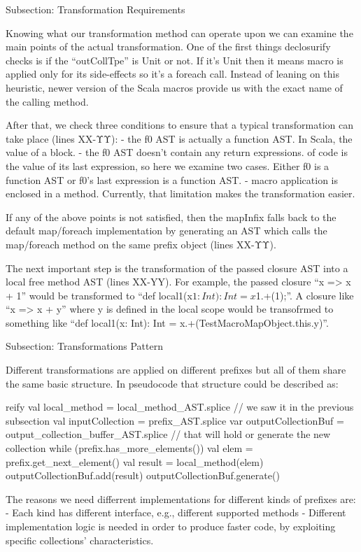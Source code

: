 Subsection: Transformation Requirements

Knowing what our transformation method can operate upon we can examine the
main points of the actual transformation. One of the first things declosurify
checks is if the ``outCollTpe'' is Unit or not. If it's Unit then it means
macro is applied only for its side-effects so it's a foreach call. Instead of
leaning on this heuristic, newer version of the Scala macros provide us with the
exact name of the calling method.

After that, we check three conditions to ensure that a typical
transformation can take place (lines XX-ΥΥ):
- the f0 AST is actually a function AST. In Scala, the value of a block.
- the f0 AST doesn't contain any return expressions.
of code is the value of its last expression, so here we examine two cases.
Either f0 is a function AST or f0's last expression is a function AST.
- macro application is enclosed in a method. Currently, that limitation makes
the transformation easier.

If any of the above points is not satisfied, then the mapInfix falls back to the
default map/foreach implementation by generating an AST which
calls the map/foreach method on the same prefix object (lines XX-ΥΥ).

The next important step is the transformation of the passed closure AST
into a local free method AST (lines XX-YY). For example, the passed closure ``x
=> x + 1'' would be transformed to ``def local1(x$1: Int): Int = x$1.+(1);''. A
closure like ``x => x + y'' where y is defined in the local scope would be
transofrmed to something like ``def local1(x: Int): Int =
x.+(TestMacroMapObject.this.y)''.


Subsection: Transformations Pattern

Different transformations are applied on different prefixes but all of them
share the same basic structure. In pseudocode that structure could be described
as:

reify {
  val local_method = local_method_AST.splice // we saw it in the previous
subsection
  val inputCollection = prefix_AST.splice
  var outputCollectionBuf = output_collection_buffer_AST.splice // that will
hold or generate the new collection
  while (prefix.has_more_elements()) {
    val elem = prefix.get_next_element()
    val result = local_method(elem)
    outputCollectionBuf.add(result)
  }
  outputCollectionBuf.generate()
}

The reasons we need differrent implementations for different kinds of
prefixes are:
- Each kind has different interface, e.g., different supported methods
- Different implementation logic is needed in order to produce faster code, by
exploiting specific collections' characteristics.

